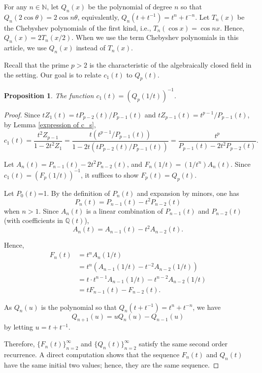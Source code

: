 \documentclass[11 pt]{amsart}
\theoremstyle{plain}
\newtheorem{prop}[thm]{Proposition}
\theoremstyle{definition}
\theoremstyle{remark}
\def\Q{\mathbb{Q}}
\def\N{\mathbb{N}}
\begin{document}
For any $n\in \N$, let $Q_n(x)$ be the polynomial of degree $n$ so that $Q_n(2\cos \theta)=2\cos n \theta$, equivalently, $Q_n(t+t^{-1})=t^n+t^{-n}$. Let $T_n(x)$ be the Chebyshev polynomials of the first kind, i.e., $T_n(\cos x)= \cos nx$. Hence, $Q_n(x)=2T_n(x/2)$. When we use the term Chebyshev polynomials in this article, we use $Q_n(x)$ instead of $T_n(x).$

Recall that the prime $p>2$ is the characteristic of the algebraically closed field in the setting. Our goal is to relate $c_1(t)$ to $Q_p(t)$.

\begin{prop}
The function $c_1(t)=(Q_p(1/t))^{-1}$.
\end{prop}

\begin{proof}
    Since $tZ_1(t)=tP_{p-2}(t)/P_{p-1}(t)$ and $tZ_{p-1}(t)=t^{p-1}/P_{p-1}(t)$, by Lemma \ref{expression of c_s}, $$c_1(t)=\frac{t^2Z_{p-1}}{1-2t^2Z_1}=\frac{t(t^{p-1}/P_{p-1}(t))}{1-2t(tP_{p-2}(t)/P_{p-1}(t))}=\frac{t^p}{P_{p-1}(t)-2t^2P_{p-2}(t)}.$$


    Let $A_n(t)=P_{n-1}(t)-2t^2P_{n-2}(t)$, and $F_n(1/t)=(1/t^n)A_n(t)$. Since $c_1(t)=(F_p(1/t))^{-1}$, it suffices to show $F_p(t)=Q_p(t).$

    Let $P_0(t)$=1. By the definition of $P_n(t)$ and expansion by minors, one has $$P_n(t)=P_{n-1}(t)-t^2P_{n-2}(t)$$ when $n>1$. Since $A_n(t)$ is a linear combination of $P_{n-1}(t)$ and $P_{n-2}(t)$ (with coefficients in $\Q(t)$), $$A_n(t)=A_{n-1}(t)-t^2A_{n-2}(t).$$

    Hence, \begin{align*}
        F_n(t)&=t^nA_n(1/t)\\
        &=t^n(A_{n-1}(1/t)-t^{-2}A_{n-2}(1/t))\\
        &=t\cdot t^{n-1}A_{n-1}(1/t)-t^{n-2}A_{n-2}(1/t)\\
        &=tF_{n-1}(t)-F_{n-2}(t).
    \end{align*}

    As $Q_n(u)$ is the polynomial so that $Q_n(t+t^{-1})=t^n+t^{-n}$, we have $$Q_{n+1}(u)=uQ_n(u)-Q_{n-1}(u)$$ by letting $u=t+t^{-1}$.


Therefore, $\{F_n(t)\}_{n=2}^\infty$ and $\{Q_n(t)\}_{n=2}^\infty$ satisfy the same second order recurrence. A direct computation shows that the sequence $F_n(t)$ and $Q_n(t)$ have the same initial two values; hence, they are the same sequence.
\end{proof}
\end{document}
